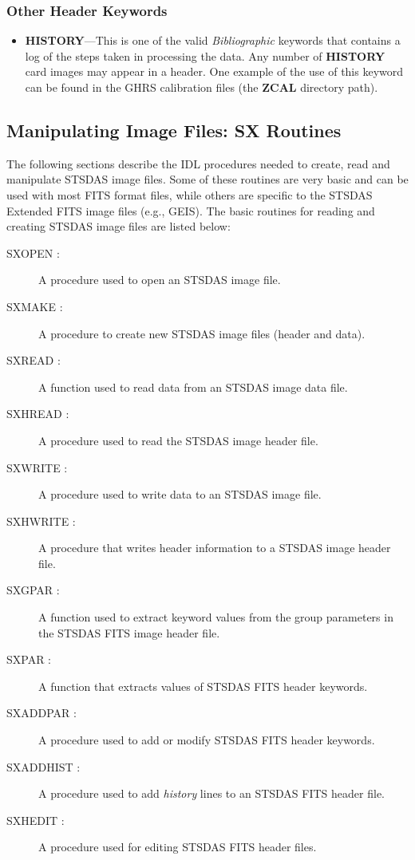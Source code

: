 \subsubsection{\bf Other Header Keywords}

\begin{itemize}

\item {\bf HISTORY}---This is one of the valid {\it Bibliographic} keywords 
that contains a log of the steps taken in 
processing the data.  Any number of {\bf HISTORY} card images may appear in a
header.  One example of the use of this keyword can be found in the 
GHRS calibration files (the {\bf ZCAL} directory path).

\end{itemize}
\newpage

\subsection{\bf Manipulating Image Files: SX Routines}
\label{sdas images}

The 
following sections describe the IDL procedures needed to create,
read and manipulate STSDAS image files.  Some of these routines are very
basic and can be used with most FITS format files, while others are
specific to the STSDAS Extended FITS image files (e.g., GEIS).
The basic routines for reading and creating STSDAS image files are listed 
below:\\

\begin{description}
\item [SXOPEN :] A procedure used to open an STSDAS image file.
\item [SXMAKE :] A procedure to create new STSDAS image files (header and data).
\item [SXREAD :] A function used to read data from an STSDAS image data file.
\item [SXHREAD :] A procedure used to read the STSDAS image header file.
\item [SXWRITE :] A procedure used to write data to an STSDAS image file.
\item [SXHWRITE :] A procedure that writes header information to a STSDAS image 
header file.
\item [SXGPAR :] A function used to extract keyword values from the group
parameters in the STSDAS FITS image header file.
\item [SXPAR :] A function that extracts values of STSDAS FITS header keywords.
\item [SXADDPAR :] A procedure used to add or modify STSDAS FITS header keywords.
\item [SXADDHIST :] A procedure used to add {\it history} lines to an STSDAS 
FITS header file.
\item [SXHEDIT :] A procedure used for editing STSDAS FITS header files.
\end{description}

